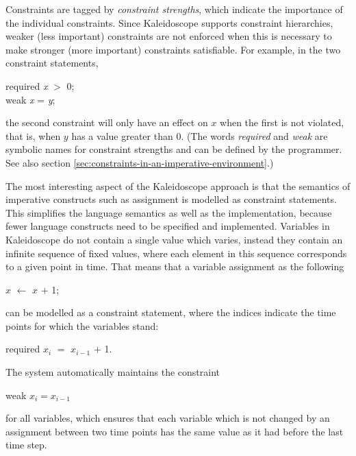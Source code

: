 Constraints are tagged by {\em constraint strengths}, which indicate
the importance of the individual constraints.  Since Kaleidoscope
supports constraint hierarchies, weaker (less important) constraints
are not enforced when this is necessary to make stronger (more
important) constraints satisfiable.  For example, in the two
constraint statements,
%
\begin{ttlprog}
 required {\em x} $>$ 0;\\
 weak {\em x} = {\em y};
\end{ttlprog}
%
the second constraint will only have an effect on $x$ when the first
is not violated, that is, when $y$ has a value greater than $0$.  (The
words {\em required} and {\em weak} are symbolic names for constraint
strengths and can be defined by the programmer.  See also section
\ref{sec:constraints-in-an-imperative-environment}.)

The most interesting aspect of the Kaleidoscope approach is that the
semantics of imperative constructs such as assignment is modelled as
constraint statements.  This simplifies the language semantics as well
as the implementation, because fewer language constructs need to be
specified and implemented.  Variables in Kaleidoscope do not contain a
single value which varies, instead they contain an infinite sequence
of fixed values, where each element in this sequence corresponds to a
given point in time.  That means that a variable assignment as the
following
%
\begin{ttlprog}
\>$x$ $\leftarrow$ $x$ $+$ 1;
\end{ttlprog}
%
can be modelled as a constraint statement, where the indices indicate
the time points for which the variables stand:
%
\begin{ttlprog}
 required $x_{i}$ $=$ $x_{i-1}$ $+$ 1.
\end{ttlprog}
%
The system automatically maintains the constraint
%
\begin{ttlprog}
 weak $x_i = x_{i-1}$
\end{ttlprog}
%
for all variables, which ensures that each variable which is not
changed by an assignment between two time points has the same value as
it had before the last time step.

